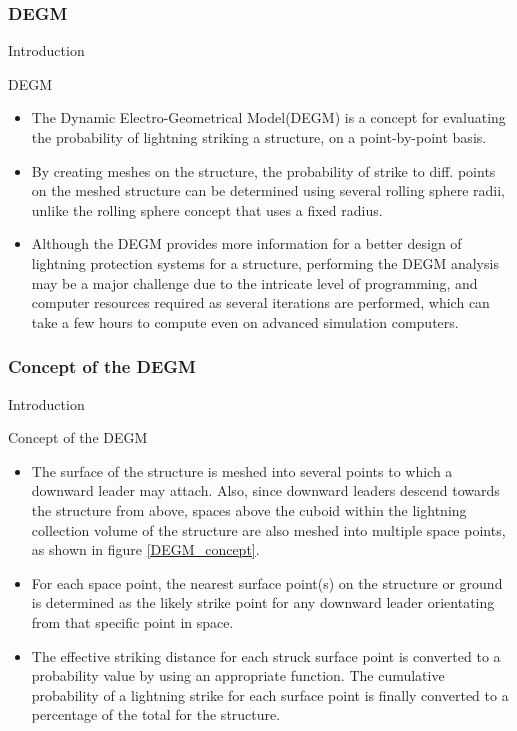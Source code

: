 \documentclass{beamer}
\begin{document}
\subsubsection{DEGM}
\begin{frame}{Introduction}
    \begin{block}{DEGM}
    \begin{itemize}
        \justifying
        \item The Dynamic Electro-Geometrical Model(DEGM) is a concept for evaluating the probability of lightning striking a structure, on a point-by-point basis.
        \item By creating meshes on the structure, the probability of strike to diff. points on the meshed structure can be determined using several rolling sphere radii, unlike the rolling sphere concept that uses a fixed radius.
        \item Although the DEGM provides more information for a better design of lightning protection systems for a structure, performing the DEGM analysis may be a major challenge due to the intricate level of programming, and computer resources required as several iterations are performed, which can take a few hours to compute even on advanced simulation computers.
    \end{itemize}
    \end{block}
\end{frame}

\subsubsection{Concept of the DEGM}
\begin{frame}{Introduction}
    \begin{block}{Concept of the DEGM}
    \begin{itemize}
        \justifying
        \item The surface of the structure is meshed into several points to which a downward leader may attach. Also, since downward leaders descend towards the structure from above, spaces above the cuboid within the lightning collection volume of the structure are also meshed into multiple space points, as shown in figure \ref{DEGM_concept}.
        \item For each space point, the nearest surface point(s) on the structure or ground is determined as the likely strike point for any downward leader orientating from that specific point in space.
        \item The effective striking distance for each struck surface point is converted to a probability value by using an appropriate function. The cumulative probability of a lightning strike for each surface point is finally converted to a percentage of the total for the structure.
    \end{itemize}
    \end{block}
\end{frame}
\end{document}
